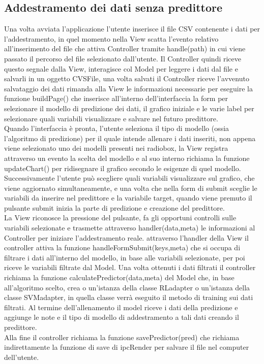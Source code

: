 \documentclass[../manuale-sviluppatore.tex]{subfiles}
\begin{document}
\subsection{Addestramento dei dati senza predittore}
\label{ssec:addestramento_dati_senza_predittore}
Una volta avviata l'applicazione l'utente inserisce il file CSV contenente i dati per l'addestramento, in quel momento nella View scatta l'evento relativo all'inserimento del file
che attiva Controller tramite handle(path) in cui viene passato il percorso del file selezionato dall'utente. Il Controller quindi riceve questo segnale dalla View, interagisce col Model
per leggere i dati dal file e salvarli in un oggetto CVSFile, una volta salvati il Controller riceve l'avvenuto salvataggio dei dati rimanda alla View le informazioni necessarie per eseguire
la funzione buildPage() che inserisce all'interno dell'interfaccia la form per selezionare il modello di predizione dei dati, il grafico iniziale e le varie label per selezionare quali variabili
visualizzare e salvare nel futuro predittore. \\
Quando l'interfaccia è pronta, l'utente seleziona il tipo di modello (ossia l'algoritmo di predizione) per il quale intende allenare i dati inseriti, non appena viene selezionato uno dei modelli
presenti nei radiobox, la View registra attraverso un evento la scelta del modello e al suo interno richiama la funzione updateChart() per ridisegnare il grafico secondo le esigenze di quel modello.
Successivamente l'utente può scegliere quali variabili visualizzare sul grafico, che viene aggiornato simultaneamente, e una volta che nella form di submit sceglie le variabili da inserire nel predittore e la variabile target,
quando viene premuto il pulsante submit inizia la parte di predizione e creazione del predittore. \\
La View riconosce la pressione del pulsante, fa gli opportuni controlli sulle variabili selezionate e trasmette attraverso handler(data,meta) le informazioni al Controller per iniziare l'addestramento reale.
attraverso l'handler della View il controller attiva la funzione handleFormSubmit(keys,meta) che si occupa di filtrare i dati all'interno del modello, in base alle variabili selezionate, per poi riceve le variabili filtrate dal Model.
Una volta ottenuti i dati filtrati il controller richiama la funzione calculatePredictor(data,meta) del Model che, in base all'algoritmo scelto, crea o un'istanza della classe RLadapter o un'istanza della classe SVMadapter, in quella classe verrà eseguito il metodo di training sui dati filtrati.
Al termine dell'allenamento il model riceve i dati della predizione e aggiunge le note e il tipo di modello di addestramento a tali dati creando il predittore. \\
Alla fine il controller richiama la funzione savePredictor(pred) che richiama indirettamente la funzione di save di ipcRender per salvare il file nel computer dell'utente.
\end{document}
